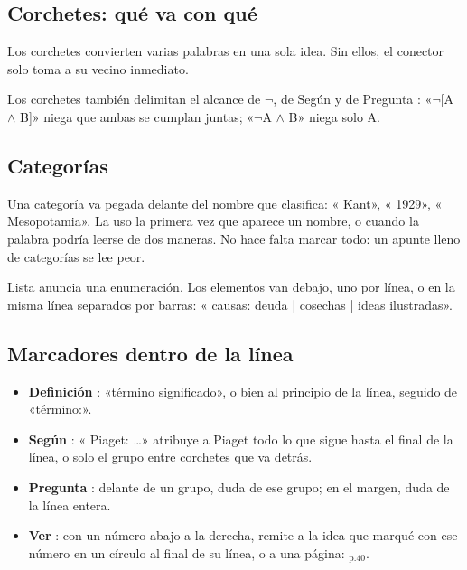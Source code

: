 \subsection{Corchetes: qué va con qué}
Los corchetes convierten varias palabras en una sola idea. Sin ellos, el conector
solo toma a su vecino inmediato.
\begin{apunte}
\end{apunte}

Los corchetes también delimitan el alcance de \(\neg\), de Según  y de
Pregunta : «\(\neg\)[A \(\wedge\) B]» niega que ambas se cumplan
juntas; «\(\neg\)A \(\wedge\) B» niega solo A.

\subsection{Categorías}
Una categoría va pegada delante del nombre que clasifica: « Kant»,
« 1929», « Mesopotamia». La uso la primera vez que aparece
un nombre, o cuando la palabra podría leerse de dos maneras. No hace falta
marcar todo: un apunte lleno de categorías se lee peor.

Lista  anuncia una enumeración. Los elementos van debajo, uno por
línea, o en la misma línea separados por barras:
« causas: deuda | cosechas | ideas ilustradas».

\subsection{Marcadores dentro de la línea}
\begin{itemize}
\item \textbf{Definición} : «término  significado», o bien
  al principio de la línea, seguido de «término:».
\item \textbf{Según} : « Piaget: \ldots» atribuye a Piaget todo
 lo que sigue hasta el final de la línea, o solo el grupo entre corchetes que
 va detrás.
\item \textbf{Pregunta} : delante de un grupo, duda de ese grupo; en el
 margen, duda de la línea entera.
\item \textbf{Ver} : con un número abajo a la derecha, remite a la idea
 que marqué con ese número en un círculo al final de su línea, o a una página:
 \(_{\text{p.40}}\).
\end{itemize}

